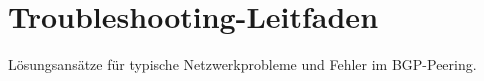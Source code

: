 \chapter{Troubleshooting-Leitfaden}

Lösungsansätze für typische Netzwerkprobleme und Fehler im BGP-Peering.